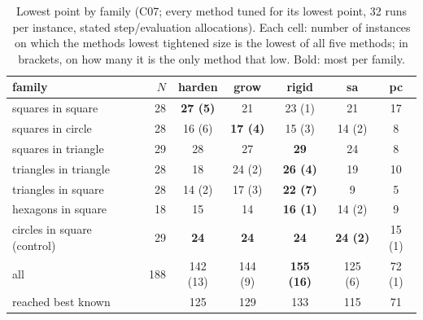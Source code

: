 \begin{table}[t]\centering\small
\begin{tabular}{lrccccc}
\toprule
family & $N$ & \textbf{harden} & \textbf{grow} & \textbf{rigid} & \textbf{sa} & \textbf{pc} \\
\midrule
squares in square & 28 & \textbf{27 (5)} & 21 & 23 (1) & 21 & 17 \\
squares in circle & 28 & 16 (6) & \textbf{17 (4)} & 15 (3) & 14 (2) & 8 \\
squares in triangle & 29 & 28 & 27 & \textbf{29} & 24 & 8 \\
triangles in triangle & 28 & 18 & 24 (2) & \textbf{26 (4)} & 19 & 10 \\
triangles in square & 28 & 14 (2) & 17 (3) & \textbf{22 (7)} & 9 & 5 \\
hexagons in square & 18 & 15 & 14 & \textbf{16 (1)} & 14 (2) & 9 \\
circles in square (control) & 29 & \textbf{24} & \textbf{24} & \textbf{24} & \textbf{24 (2)} & 15 (1) \\
\midrule
all & 188 & 142 (13) & 144 (9) & \textbf{155 (16)} & 125 (6) & 72 (1) \\
reached best known & & 125 & 129 & 133 & 115 & 71 \\
\bottomrule
\end{tabular}
\caption{Lowest point by family (C07; every method tuned for its lowest point, 32 runs per instance, stated step/evaluation allocations). Each cell: number of instances on which the method\textquotesingle s lowest tightened size is the lowest of all five methods; in brackets, on how many it is the only method that low. Bold: most per family.}
\label{tab:main}
\end{table}
